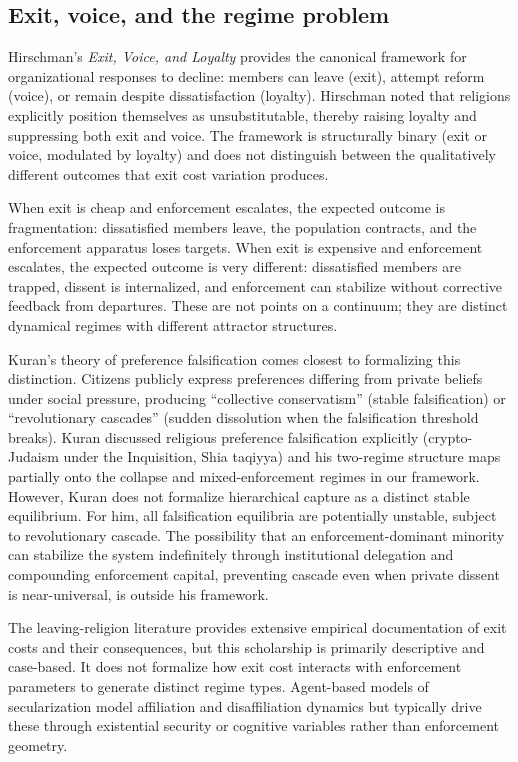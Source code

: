 \documentclass[12pt]{article}
\begin{document}
\subsection{Exit, voice, and the regime problem}

Hirschman's \cite{hirschman1970} \textit{Exit, Voice, and Loyalty} provides the canonical framework for organizational responses to decline: members can leave (exit), attempt reform (voice), or remain despite dissatisfaction (loyalty). Hirschman noted that religions explicitly position themselves as unsubstitutable, thereby raising loyalty and suppressing both exit and voice. The framework is structurally binary (exit or voice, modulated by loyalty) and does not distinguish between the qualitatively different outcomes that exit cost variation produces.

When exit is cheap and enforcement escalates, the expected outcome is fragmentation: dissatisfied members leave, the population contracts, and the enforcement apparatus loses targets. When exit is expensive and enforcement escalates, the expected outcome is very different: dissatisfied members are trapped, dissent is internalized, and enforcement can stabilize without corrective feedback from departures. These are not points on a continuum; they are distinct dynamical regimes with different attractor structures.

Kuran's \cite{kuran1995} theory of preference falsification comes closest to formalizing this distinction. Citizens publicly express preferences differing from private beliefs under social pressure, producing ``collective conservatism'' (stable falsification) or ``revolutionary cascades'' (sudden dissolution when the falsification threshold breaks). Kuran discussed religious preference falsification explicitly (crypto-Judaism under the Inquisition, Shia taqiyya) and his two-regime structure maps partially onto the collapse and mixed-enforcement regimes in our framework. However, Kuran does not formalize hierarchical capture as a distinct stable equilibrium. For him, all falsification equilibria are potentially unstable, subject to revolutionary cascade. The possibility that an enforcement-dominant minority can stabilize the system indefinitely through institutional delegation and compounding enforcement capital, preventing cascade even when private dissent is near-universal, is outside his framework.

The leaving-religion literature \cite{bromley1998,cragun2011,streib2009} provides extensive empirical documentation of exit costs and their consequences, but this scholarship is primarily descriptive and case-based. It does not formalize how exit cost interacts with enforcement parameters to generate distinct regime types. Agent-based models of secularization \cite{gelfand2011,norenzayan2013} model affiliation and disaffiliation dynamics but typically drive these through existential security or cognitive variables rather than enforcement geometry.
\end{document}
